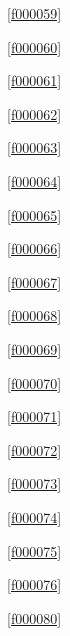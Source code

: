 \noindent\filesourcenumbernameone\ \ref{f000059}\dotfill\pageref{f000059}%

\noindent\filesourcenumbernameone\ \ref{f000060}\dotfill\pageref{f000060}%

\noindent\filesourcenumbernameone\ \ref{f000061}\dotfill\pageref{f000061}%

\noindent\filesourcenumbernameone\ \ref{f000062}\dotfill\pageref{f000062}%

\noindent\filesourcenumbernameone\ \ref{f000063}\dotfill\pageref{f000063}%

\noindent\filesourcenumbernameone\ \ref{f000064}\dotfill\pageref{f000064}%

\noindent\filesourcenumbernameone\ \ref{f000065}\dotfill\pageref{f000065}%

\noindent\filesourcenumbernameone\ \ref{f000066}\dotfill\pageref{f000066}%

\noindent\filesourcenumbernameone\ \ref{f000067}\dotfill\pageref{f000067}%

\noindent\filesourcenumbernameone\ \ref{f000068}\dotfill\pageref{f000068}%

\noindent\filesourcenumbernameone\ \ref{f000069}\dotfill\pageref{f000069}%

\noindent\filesourcenumbernameone\ \ref{f000070}\dotfill\pageref{f000070}%

\noindent\filesourcenumbernameone\ \ref{f000071}\dotfill\pageref{f000071}%

\noindent\filesourcenumbernameone\ \ref{f000072}\dotfill\pageref{f000072}%

\noindent\filesourcenumbernameone\ \ref{f000073}\dotfill\pageref{f000073}%

\noindent\filesourcenumbernameone\ \ref{f000074}\dotfill\pageref{f000074}%

\noindent\filesourcenumbernameone\ \ref{f000075}\dotfill\pageref{f000075}%

\noindent\filesourcenumbernameone\ \ref{f000076}\dotfill\pageref{f000076}%

\noindent\filesourcenumbernameone\ \ref{f000080}\dotfill\pageref{f000080}%









